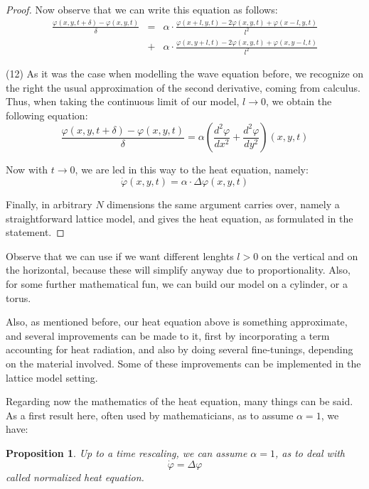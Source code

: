 \documentclass[12pt]{amsbook}
\newtheorem{proposition}[theorem]{Proposition}
\begin{document}
\begin{proof}
Now observe that we can write this equation as follows:
\begin{eqnarray*}
\frac{\varphi(x,y,t+\delta)-\varphi(x,y,t)}{\delta}
&=&\alpha\cdot\frac{\varphi(x+l,y,t)-2\varphi(x,y,t)+\varphi(x-l,y,t)}{l^2}\\
&+&\alpha\cdot\frac{\varphi(x,y+l,t)-2\varphi(x,y,t)+\varphi(x,y-l,t)}{l^2}
\end{eqnarray*}

(12) As it was the case when modelling the wave equation before, we recognize on the right the usual approximation of the second derivative, coming from calculus. Thus, when taking the continuous limit of our model, $l\to 0$, we obtain the following equation:
$$\frac{\varphi(x,y,t+\delta)-\varphi(x,y,t)}{\delta}
=\alpha\left(\frac{d^2\varphi}{dx^2}+\frac{d^2\varphi}{dy^2}\right)(x,y,t)$$

Now with $t\to0$, we are led in this way to the heat equation, namely:
$$\dot{\varphi}(x,y,t)=\alpha\cdot\Delta\varphi(x,y,t)$$

Finally, in arbitrary $N$ dimensions the same argument carries over, namely a straightforward lattice model, and gives the heat equation, as formulated in the statement.
\end{proof}

Observe that we can use if we want different lenghts $l>0$ on the vertical and on the horizontal, because these will simplify anyway due to proportionality. Also, for some further mathematical fun, we can build our model on a cylinder, or a torus.

\bigskip

Also, as mentioned before, our heat equation above is something approximate, and several improvements can be made to it, first by incorporating a term accounting for heat radiation, and also by doing several fine-tunings, depending on the material involved. Some of these improvements can be implemented in the lattice model setting.

\bigskip

Regarding now the mathematics of the heat equation, many things can be said. As a first result here, often used by mathematicians, as to assume $\alpha=1$, we have:


\begin{proposition}
Up to a time rescaling, we can assume $\alpha=1$, as to deal with
$$\dot\varphi=\Delta\varphi$$
called normalized heat equation.
\end{proposition}
\end{document}
